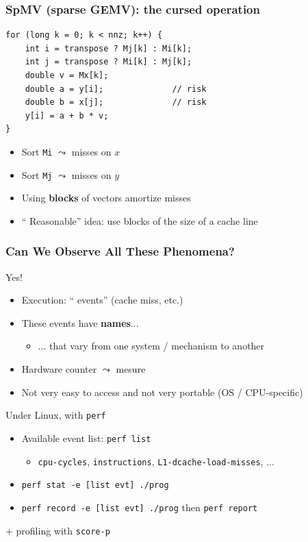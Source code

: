 \documentclass[xcolor={x11names,svgnames}]{beamer}
\newcommand{\red}[1]{{\color{red}#1}}
\begin{document}
\begin{frame}[fragile]
  \frametitle{SpMV (sparse GEMV): the cursed operation}

\begin{verbatim}
for (long k = 0; k < nnz; k++) {
    int i = transpose ? Mj[k] : Mi[k];
    int j = transpose ? Mi[k] : Mj[k];
    double v = Mx[k];
    double a = y[i];              // risk
    double b = x[j];              // risk
    y[i] = a + b * v;
}
\end{verbatim}

  \begin{itemize}
  \item Sort \texttt{Mi} $\leadsto$ misses on $x$
  \item Sort \texttt{Mj} $\leadsto$ misses on $y$    
  \item Using \textbf{blocks} of vectors \red{amortize} misses
  \item `` Reasonable'' idea: use blocks of the size of a cache line
  \end{itemize}
\end{frame}


\begin{frame}
  \frametitle{Can We Observe All These Phenomena?}

  \begin{exampleblock}{Yes!}
    \begin{itemize}
    \item Execution: `` events'' (cache miss, etc.)
    \item These events have \textbf{names}...
      \begin{itemize}
      \item ... that vary from one system / mechanism to another
      \end{itemize}
    \item Hardware counter $\leadsto$ mesure
    \item Not very easy to access and not very portable (OS / CPU-specific)
    \end{itemize}
  \end{exampleblock}
  
  \begin{block}{Under Linux, with \texttt{perf}}
    \begin{itemize}
    \item Available event list: \texttt{perf list}
      \begin{itemize}
      \item \texttt{cpu-cycles}, \texttt{instructions}, \texttt{L1-dcache-load-misses}, ...
      \end{itemize}
    \item \texttt{perf stat -e [list evt] ./prog}
    \item \texttt{perf record -e [list evt] ./prog} then \texttt{perf report}
    \end{itemize}
  \end{block}

  + profiling with \texttt{score-p}
\end{frame}
\end{document}
